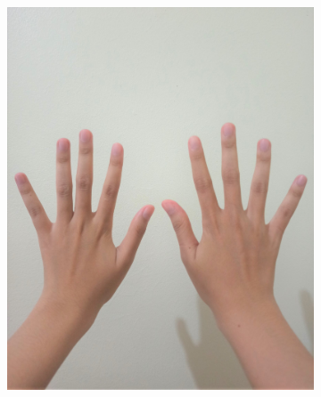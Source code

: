 \documentclass[conference]{IEEEtran}
\begin{document}
\begin{figure} [h]
\begin{center}
\begin{subfigure}[t]{0.11\textwidth}
				\includegraphics[width=\textwidth]{img/pola4.jpg}
				\caption{\label{fig:gs4}}
			\end{subfigure}
			\hspace{0.1em}
			\begin{subfigure}[t]{0.11\textwidth}

\end{subfigure}
\end{center}
\end{figure}
\end{document}
